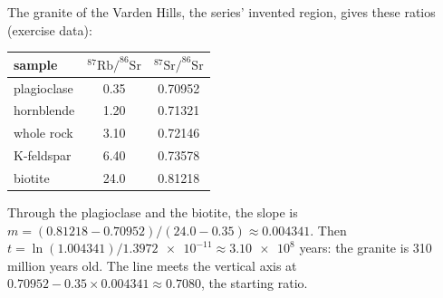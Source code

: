 \begin{example}\label{ex:g12:age-of-the-earth:varden}
The granite of the Varden Hills, the series' invented region, gives these
ratios (exercise data):
\begin{center}
\small
\begin{tabular}{|l|c|c|}
\hline
sample & $^{87}\mathrm{Rb}/^{86}\mathrm{Sr}$ & $^{87}\mathrm{Sr}/^{86}\mathrm{Sr}$ \\
\hline
plagioclase & 0.35 & 0.70952 \\
hornblende  & 1.20 & 0.71321 \\
whole rock  & 3.10 & 0.72146 \\
K-feldspar  & 6.40 & 0.73578 \\
biotite     & 24.0 & 0.81218 \\
\hline
\end{tabular}
\end{center}
Through the plagioclase and the biotite, the slope is
$m = (0.81218 - 0.70952)/(24.0 - 0.35) \approx 0.004341$. Then
$t = \ln(1.004341)/\num{1.3972e-11} \approx \num{3.10e8}$ years:
the granite is 310 million years old. The line meets the vertical axis at
$0.70952 - 0.35 \times 0.004341 \approx 0.7080$, the starting ratio.
\end{example}

